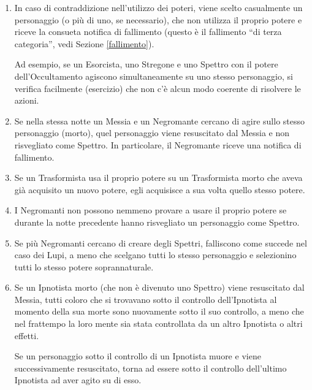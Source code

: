 \documentclass[a4paper,10pt]{article}
\begin{document}
\begin{enumerate}
 
 \item In caso di contraddizione nell'utilizzo dei poteri, viene scelto casualmente un personaggio (o più di uno, se necessario), che non utilizza il proprio potere e riceve la consueta notifica di fallimento (questo è il fallimento ``di terza categoria'', vedi Sezione \ref{fallimento}).
 
 Ad esempio, se un Esorcista, uno Stregone e uno Spettro con il potere dell'Occultamento agiscono simultaneamente su uno stesso personaggio, si verifica facilmente (esercizio) che non c'è alcun modo coerente di risolvere le azioni.
  
 \item Se nella stessa notte un Messia e un Negromante cercano di agire sullo stesso personaggio (morto), quel personaggio viene resuscitato dal Messia e non risvegliato come Spettro. In particolare, il Negromante riceve una notifica di fallimento.

 \item Se un Trasformista usa il proprio potere su un Trasformista morto che aveva già acquisito un nuovo potere, egli acquisisce a sua volta quello stesso potere.
 
 \item I Negromanti non possono nemmeno provare a usare il proprio potere se durante la notte precedente hanno risvegliato un personaggio come Spettro.
 
 \item Se più Negromanti cercano di creare degli Spettri, falliscono come succede nel caso dei Lupi, a meno che scelgano tutti lo stesso personaggio e selezionino tutti lo stesso potere soprannaturale.

 \item Se un Ipnotista morto (che non è divenuto uno Spettro) viene resuscitato dal Messia, tutti coloro che si trovavano sotto il controllo dell'Ipnotista al momento della sua morte sono nuovamente sotto il suo controllo, a meno che nel frattempo la loro mente sia stata controllata da un altro Ipnotista o altri effetti.
 
 Se un personaggio sotto il controllo di un Ipnotista muore e viene successivamente resuscitato, torna ad essere sotto il controllo dell'ultimo Ipnotista ad aver agito su di esso.
 

\end{enumerate}
\end{document}
